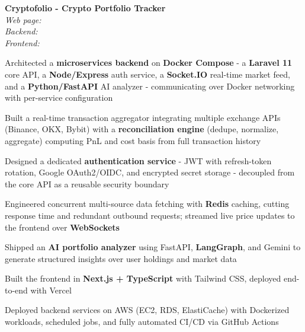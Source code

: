 \begin{twocolentry}{}
    \textbf{Cryptofolio - Crypto Portfolio Tracker} \\[4pt]
    \textit{Web page:}  \\[2pt]
    \textit{Backend:}  \\[2pt]
    \textit{Frontend:} 
\end{twocolentry}
\begin{onecolentry}
    \begin{highlights}
        \item Architected a \textbf{microservices backend} on \textbf{Docker Compose} - a \textbf{Laravel 11} core API, a \textbf{Node/Express} auth service, a \textbf{Socket.IO} real-time market feed, and a \textbf{Python/FastAPI} AI analyzer - communicating over Docker networking with per-service configuration
        \item Built a real-time transaction aggregator integrating multiple exchange APIs (Binance, OKX, Bybit) with a \textbf{reconciliation engine} (dedupe, normalize, aggregate) computing PnL and cost basis from full transaction history
        \item Designed a dedicated \textbf{authentication service} - JWT with refresh-token rotation, Google OAuth2/OIDC, and encrypted secret storage - decoupled from the core API as a reusable security boundary
        \item Engineered concurrent multi-source data fetching with \textbf{Redis} caching, cutting response time and redundant outbound requests; streamed live price updates to the frontend over \textbf{WebSockets}
        \item Shipped an \textbf{AI portfolio analyzer} using FastAPI, \textbf{LangGraph}, and Gemini to generate structured insights over user holdings and market data
        \item Built the frontend in \textbf{Next.js + TypeScript} with Tailwind CSS, deployed end-to-end with Vercel
        \item Deployed backend services on AWS (EC2, RDS, ElastiCache) with Dockerized workloads, scheduled jobs, and fully automated CI/CD via GitHub Actions
    \end{highlights}
\end{onecolentry}


